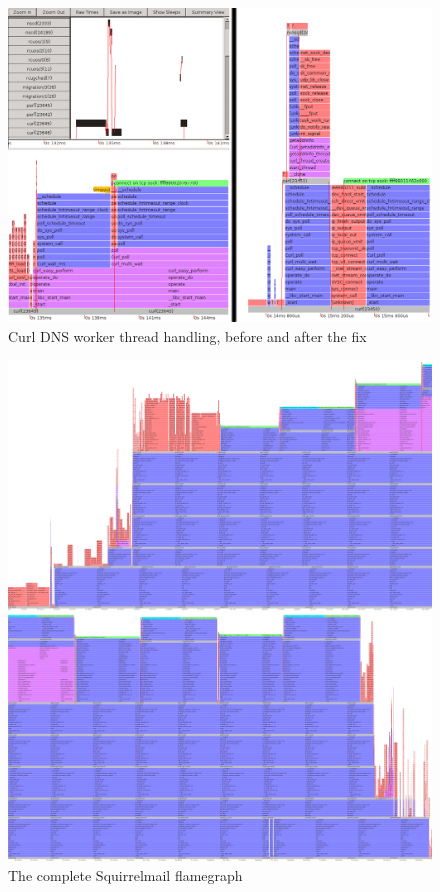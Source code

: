 \documentclass[10pt]{article}
\begin{document}
\vspace{1in}

\begin{figure}[h]
\includegraphics[width=6.5in]{images/curlBeforeAndAfter}
\caption{Curl DNS worker thread handling, before and after the fix}
\label{fig:curl}
\end{figure}

\begin{figure}[p]
\includegraphics[width=6.5in]{images/squirrelbest}
\caption{The complete Squirrelmail flamegraph}
\label{fig:sq}
\end{figure}
\end{document}
